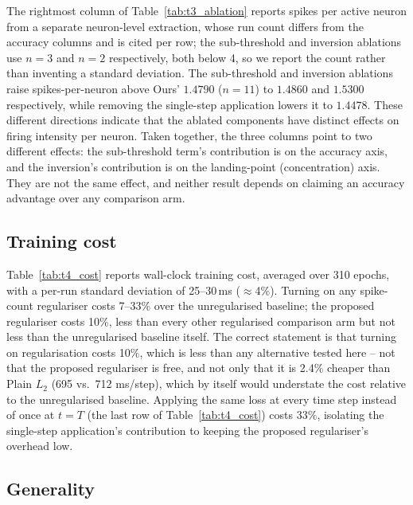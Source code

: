 The rightmost column of Table~\ref{tab:t3_ablation} reports spikes per
active neuron from a separate neuron-level extraction, whose run count
differs from the accuracy columns and is cited per row; the sub-threshold
and inversion ablations use $n=3$ and $n=2$ respectively, both below 4, so
we report the count rather than inventing a standard deviation. The
sub-threshold and inversion ablations raise spikes-per-neuron above Ours'
$1.4790$ ($n=11$) to $1.4860$ and $1.5300$ respectively, while removing
the single-step application lowers it to $1.4478$. These different
directions indicate that the ablated components have distinct effects on
firing intensity per neuron. Taken together, the three
columns point to two different effects: the sub-threshold term's
contribution is on the accuracy axis, and the inversion's contribution is
on the landing-point (concentration) axis. They are not the same effect,
and neither result depends on claiming an accuracy advantage over any
comparison arm.



\subsection{Training cost}
\label{sec:exp-cost}

Table~\ref{tab:t4_cost} reports wall-clock training cost, averaged over 310
epochs, with a per-run standard deviation of 25--30\,ms ($\approx$4\%).
Turning on any spike-count regulariser costs 7--33\% over the unregularised
baseline; the proposed regulariser costs 10\%, less than every other
regularised comparison arm but not less than the unregularised baseline
itself. The correct statement is that turning on regularisation costs 10\%,
which is less than any alternative tested here -- not that the proposed
regulariser is free, and not only that it is 2.4\% cheaper than Plain
$L_2$ (695 vs.\ 712 ms/step), which by itself would understate the cost
relative to the unregularised baseline. Applying the same loss at every
time step instead of once at $t=T$ (the last row of
Table~\ref{tab:t4_cost}) costs 33\%, isolating the single-step
application's contribution to keeping the proposed regulariser's overhead
low.



\subsection{Generality}
\label{sec:exp-generality}


